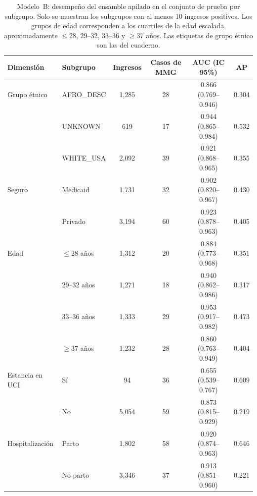 \documentclass[healthcare,article,submit,pdftex,moreauthors]{Definitions/mdpi_es}
\begin{document}
\begin{table}[H]
\caption{Modelo~B: desempeño del ensamble apilado en el conjunto de prueba por subgrupo. Solo se muestran los subgrupos con al menos 10 ingresos positivos.
Los grupos de edad corresponden a los cuartiles de la edad escalada, aproximadamente $\leq$28, 29--32, 33--36 y $\geq$37 años. Las etiquetas de grupo étnico son las del cuaderno.\label{tab:subgroup}}
\small
\begin{tabularx}{\textwidth}{llccCc}
\toprule
\textbf{Dimensión} & \textbf{Subgrupo} & \textbf{Ingresos} & \textbf{Casos de MMG} & \textbf{AUC (IC 95\%)} & \textbf{AP}\\
\midrule
Grupo étnico & AFRO\_DESC & 1{,}285 & 28 & 0.866 (0.769--0.946) & 0.304\\
 & UNKNOWN & 619 & 17 & 0.944 (0.865--0.984) & 0.532\\
 & WHITE\_USA & 2{,}092 & 39 & 0.921 (0.868--0.965) & 0.355\\
Seguro & Medicaid & 1{,}731 & 32 & 0.902 (0.820--0.967) & 0.430\\
 & Privado & 3{,}194 & 60 & 0.923 (0.878--0.963) & 0.405\\
Edad & $\leq$28 años & 1{,}312 & 20 & 0.884 (0.773--0.968) & 0.351\\
 & 29--32 años & 1{,}271 & 18 & 0.940 (0.862--0.986) & 0.317\\
 & 33--36 años & 1{,}333 & 29 & 0.953 (0.917--0.982) & 0.473\\
 & $\geq$37 años & 1{,}232 & 28 & 0.860 (0.763--0.949) & 0.404\\
Estancia en UCI & Sí & 94 & 36 & 0.655 (0.539--0.767) & 0.609\\
 & No & 5{,}054 & 59 & 0.873 (0.815--0.929) & 0.219\\
Hospitalización & Parto & 1{,}802 & 58 & 0.920 (0.874--0.963) & 0.646\\
 & No parto & 3{,}346 & 37 & 0.913 (0.851--0.960) & 0.221\\
\bottomrule
\end{tabularx}
\end{table}

\end{document}
